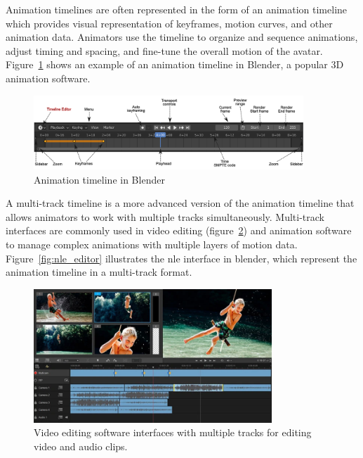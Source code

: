 \documentclass[../../main.tex]{subfiles}
\begin{document}
Animation timelines are often represented in the form of an animation timeline which provides visual representation of keyframes, motion curves, and other animation data. Animators use the timeline to organize and sequence animations, adjust timing and spacing, and fine-tune the overall motion of the avatar. Figure~\ref{fig:animation_timeline} shows an example of an animation timeline in Blender, a popular 3D animation software.

\begin{figure} 
  \centering \includegraphics[width = 4in]{chapters/background_work/images/animation_timeline.png}
  \caption{Animation timeline in Blender} 
  \label{fig:animation_timeline}
\end{figure}

A multi-track timeline is a more advanced version of the animation timeline that allows animators to work with multiple tracks simultaneously. Multi-track interfaces are commonly used in video editing (figure~\ref{fig:video_edit}) and animation software to manage complex animations with multiple layers of motion data. Figure~\ref{fig:nle_editor} illustrates the \gls{nle} interface in blender, which represent the animation timeline in a multi-track format.

\begin{figure}
    \centering
    \includegraphics[width=0.8\textwidth]{chapters/background_work/images/video_editing.png}
    \caption{Video editing software interfaces with multiple tracks for editing video and audio clips.}
    \label{fig:video_edit}
\end{figure}
\end{document}
